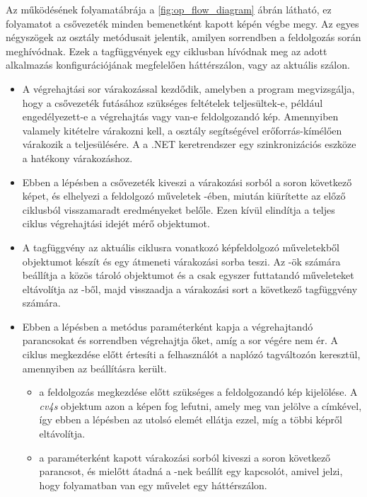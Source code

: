 Az  működésének folyamatábrája a \ref{fig:op_flow_diagram} ábrán látható, ez folyamatot a csővezeték minden bemenetként kapott képén végbe megy. Az egyes négyszögek az osztály metódusait jelentik, amilyen sorrendben a feldolgozás során meghívódnak. Ezek a tagfüggvények egy ciklusban hívódnak meg az adott alkalmazás konfigurációjának megfelelően háttérszálon, vagy az aktuális szálon.

\begin{itemize}
\item {} A végrehajtási sor várakozással kezdődik, amelyben a program megvizsgálja, hogy a csővezeték futásához szükséges feltételek teljesültek-e, például engedélyezett-e a végrehajtás vagy van-e feldolgozandó kép. Amennyiben valamely kitételre várakozni kell, a  osztály segítségével erőforrás-kímélően várakozik a teljesülésére. A  a .NET keretrendszer egy szinkronizációs eszköze a hatékony várakozáshoz.
\item {} Ebben a lépésben a csővezeték kiveszi a  várakozási sorból a soron következő képet, és elhelyezi a feldolgozó műveletek -ében, miután kiürítette az előző ciklusból visszamaradt eredményeket belőle. Ezen kívül elindítja a teljes ciklus végrehajtási idejét mérő  objektumot.
\item {} A tagfüggvény az aktuális ciklusra vonatkozó képfeldolgozó műveletekből  objektumot készít és egy átmeneti várakozási sorba teszi. Az -ök számára beállítja a közös tároló objektumot és a csak egyszer futtatandó műveleteket eltávolítja az -ből, majd visszaadja a várakozási sort a következő tagfüggvény számára.
\item {} Ebben a lépésben a metódus paraméterként kapja a végrehajtandó parancsokat és sorrendben végrehajtja őket, amíg a sor végére nem ér. A ciklus megkezdése előtt értesíti a felhasználót a naplózó tagváltozón keresztül, amennyiben az beállításra került. 
\begin{itemize}
	\item {} a feldolgozás megkezdése előtt szükséges a feldolgozandó kép kijelölése. A \emph{cv4s}  objektum azon a képen fog lefutni, amely meg van jelölve a  címkével, így ebben a lépésben az  utolsó elemét ellátja ezzel, míg a többi képről eltávolítja.
	\item {} a paraméterként kapott várakozási sorból kiveszi a soron következő parancsot, és mielőtt átadná a -nek beállít egy kapcsolót, amivel jelzi, hogy folyamatban van egy művelet egy háttérszálon.

\end{itemize}
\end{itemize}
